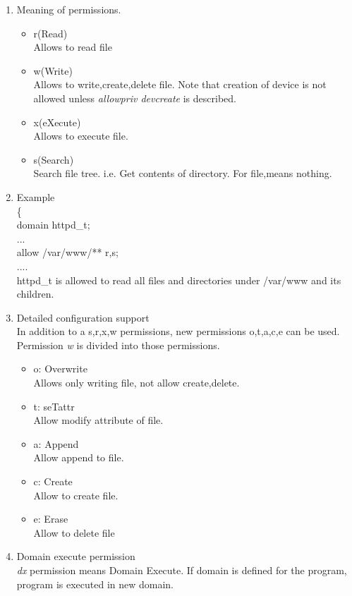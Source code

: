 \documentclass{article}
\begin{document}
\begin{enumerate}
  \item Meaning of permissions.
  \begin{itemize}
   \item r(Read)\\
	 Allows to read file
   \item w(Write)\\
	 Allows to write,create,delete file. Note that creation of
	 device is not allowed unless {\it allowpriv devcreate} is described.
   \item x(eXecute)\\
	 Allows to execute file.
   \item s(Search)\\ 
	 Search file tree. i.e. Get contents of directory. For file,means nothing.
  \end{itemize}
  \item Example\\
	\{\\
	domain httpd\_t;\\
	...\\
	allow /var/www/** r,s;\\
	....\\
	httpd\_t is allowed to read all files and directories under
	/var/www and its children.
  \item Detailed configuration support\\
	In addition to a s,r,x,w permissions, new permissions o,t,a,c,e
	can be used. Permission {\it w} is divided into those
	permissions.\\
	\begin{itemize}
	 \item o: Overwrite\\
	       Allows only writing file, not allow create,delete.
	 \item t: seTattr\\
	       Allow modify attribute of file.
	 \item a: Append\\
	       Allow append to file.
	 \item c: Create\\
	       Allow to create file.
	 \item e: Erase\\
	       Allow to delete file  
	\end{itemize}
  \item Domain execute permission\\
	{\it dx} permission means Domain Execute. If domain is defined
	for the program, program is executed in new domain.

\end{enumerate}
\end{document}

